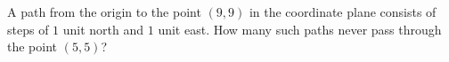 A path from the origin to the point $(9,9)$ in the coordinate plane consists of steps of $1$ unit north and $1$ unit east. How many such paths never pass through the point $(5,5)$?
